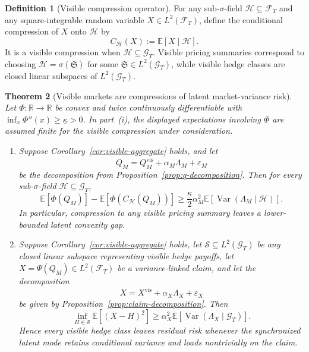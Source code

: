 \documentclass[11pt,a4paper]{amsart}
\theoremstyle{plain}
\newtheorem{theorem}{Theorem}[section]
\theoremstyle{definition}
\newtheorem{definition}[theorem]{Definition}
\theoremstyle{remark}
\DeclareMathOperator{\Var}{Var}
\newcommand{\R}{\mathbb{R}}
\newcommand{\EE}{\mathbb{E}}
\newcommand{\cH}{\mathcal{H}}
\newcommand{\cF}{\mathcal{F}}
\newcommand{\cG}{\mathcal{G}}
\begin{document}
\begin{definition}[Visible compression operator]\label{def:compression}
For any sub-\(\sigma\)-field \(\cH\subseteq \cF_T\) and any square-integrable random variable
\(X\in L^2(\cF_T)\), define the conditional compression of \(X\) onto \(\cH\) by
\[
        C_{\cH}(X):=\EE[X\mid \cH].
\]
It is a visible compression when \(\cH\subseteq\cG_T\).  Visible pricing summaries correspond to
choosing \(\cH=\sigma(\mathfrak S)\) for some \(\mathfrak S\in L^2(\cG_T)\), while visible hedge
classes are closed linear subspaces of \(L^2(\cG_T)\).
\end{definition}

\begin{theorem}[Visible markets are compressions of latent market-variance risk]\label{thm:compression}
Let \(\Phi\colon\R\to\R\) be convex and twice continuously differentiable with
\(\inf_x \Phi''(x)\ge \underline\kappa>0\).  In part~(i), the displayed expectations involving
\(\Phi\) are assumed finite for the visible compression under consideration.
\begin{enumerate}[label=(\roman*)]
\item Suppose Corollary~\ref{cor:visible-aggregate} holds, and let
\[
        Q_M=Q_M^{\mathrm{vis}}+\alpha_M\Lambda_M+\varepsilon_M
\]
be the decomposition from Proposition~\ref{prop:q-decomposition}.  Then for every
sub-\(\sigma\)-field \(\cH\subseteq \cG_T\),
\[
        \EE[\Phi(Q_M)]-\EE[\Phi(C_{\cH}(Q_M))]
        \ge
        \frac{\underline\kappa}{2}\alpha_M^2\EE[\Var(\Lambda_M\mid \cH)].
\]
In particular, compression to any visible pricing summary leaves a lower-bounded latent convexity
gap.
\item Suppose Corollary~\ref{cor:visible-aggregate} holds, let
\(\mathcal S\subseteq L^2(\cG_T)\) be any closed linear subspace representing visible hedge payoffs,
let \(X=\Psi(Q_M)\in L^2(\cF_T)\) be a variance-linked claim, and let the decomposition
\[
        X=X^{\mathrm{vis}}+\alpha_X\Lambda_X+\varepsilon_X
\]
be given by Proposition~\ref{prop:claim-decomposition}.  Then
\[
        \inf_{H\in \mathcal S}\EE[(X-H)^2]
        \ge
        \alpha_X^2 \EE[\Var(\Lambda_X\mid \cG_T)].
\]
Hence every visible hedge class leaves residual risk whenever the synchronized latent mode retains
conditional variance and loads nontrivially on the claim.
\end{enumerate}
\end{theorem}
\end{document}
